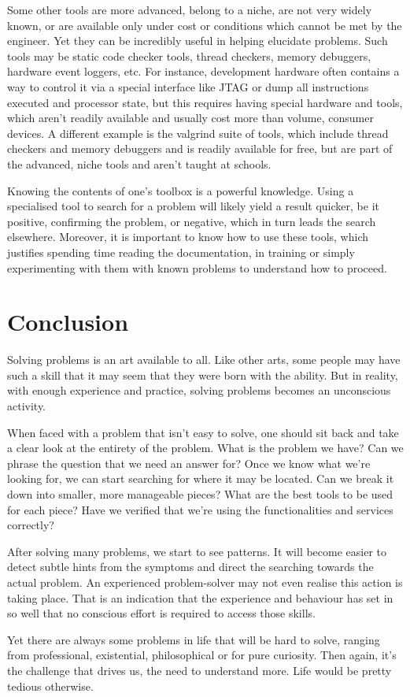 Some other tools are more advanced, belong to a niche, are not very widely known, or are available only under cost or conditions which cannot be met by the engineer. Yet they can be incredibly useful in helping elucidate problems. Such tools may be static code checker tools, thread checkers, memory debuggers, hardware event loggers, etc. For instance, development hardware often contains a way to control it via a special interface like JTAG or dump all instructions executed and processor state, but this requires having special hardware and tools, which aren’t readily available and usually cost more than volume, consumer devices. A different example is the valgrind suite of tools, which include thread checkers and memory debuggers and is readily available for free, but are part of the advanced, niche tools and aren’t taught at schools.

Knowing the contents of one’s toolbox is a powerful knowledge. Using a specialised tool to search for a problem will likely yield a result quicker, be it positive, confirming the problem, or negative, which in turn leads the search elsewhere. Moreover, it is important to know how to use these tools, which justifies spending time reading the documentation, in training or simply experimenting with them with known problems to understand how to proceed.

\section*{Conclusion}

Solving problems is an art available to all. Like other arts, some people may have such a skill that it may seem that they were born with the ability. But in reality, with enough experience and practice, solving problems becomes an unconscious activity.

When faced with a problem that isn’t easy to solve, one should sit back and take a clear look at the entirety of the problem. What is the problem we have? Can we phrase the question that we need an answer for? Once we know what we’re looking for, we can start searching for where it may be located. Can we break it down into smaller, more manageable pieces? What are the best tools to be used for each piece? Have we verified that we’re using the functionalities and services correctly?

After solving many problems, we start to see patterns. It will become easier to detect subtle hints from the symptoms and direct the searching towards the actual problem. An experienced problem-solver may not even realise this action is taking place. That is an indication that the experience and behaviour has set in so well that no conscious effort is required to access those skills.

Yet there are always some problems in life that will be hard to solve, ranging from professional, existential, philosophical or for pure curiosity. Then again, it’s the challenge that drives us, the need to understand more. Life would be pretty tedious otherwise.
